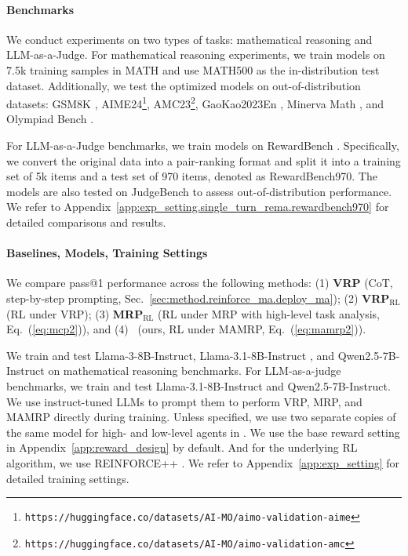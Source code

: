 \paragraph{Benchmarks} We conduct experiments on two types of tasks: mathematical reasoning and LLM-as-a-Judge. For mathematical reasoning experiments, we train models on 7.5k training samples in MATH \citep{hendrycks2021measuring} and use MATH500 \citep{lightman2023let} as the in-distribution test dataset. Additionally, we test the optimized models on out-of-distribution datasets: GSM8K \citep{cobbe2021training}, AIME24\footnote{\texttt{https://huggingface.co/datasets/AI-MO/aimo-validation-aime}}, AMC23\footnote{\texttt{https://huggingface.co/datasets/AI-MO/aimo-validation-amc}}, GaoKao2023En \citep{zhang2023evaluating}, Minerva Math \citep{lewkowycz2022solving}, and Olympiad Bench \citep{he2024olympiadbench}. 

For LLM-as-a-Judge benchmarks, we train models on RewardBench \citep{lambert2024rewardbench}. Specifically, we convert the original data into a pair-ranking format and split it into a training set of 5k items and a test set of 970 items, denoted as RewardBench970. The models are also tested on JudgeBench \citep{tan2024judgebench} to assess out-of-distribution performance. We refer to Appendix~\ref{app:exp_setting.single_turn_rema.rewardbench970} for detailed comparisons and results.

\paragraph{Baselines, Models, Training Settings} 
We compare pass@1 performance across the following methods:
(1) \textbf{VRP} (CoT, step-by-step prompting, Sec.~\ref{sec:method.reinforce_ma.deploy_ma}); 
(2) \textbf{VRP$_\text{RL}$} (RL under VRP);
(3) \textbf{MRP$_\text{RL}$} (RL under MRP with high-level task analysis, Eq.~(\ref{eq:mcp2})), and (4) \textbf{\method}~(ours, RL under MAMRP, Eq.~(\ref{eq:mamrp2})).

We train and test Llama-3-8B-Instruct, Llama-3.1-8B-Instruct \citep{dubey2024llama}, and Qwen2.5-7B-Instruct \citep{qwen2.5} on mathematical reasoning benchmarks.
For LLM-as-a-judge benchmarks, we train and test Llama-3.1-8B-Instruct and Qwen2.5-7B-Instruct. 
We use instruct-tuned LLMs to prompt them to perform VRP, MRP, and MAMRP directly during training.
Unless specified, we use two separate copies of the same model for high- and low-level agents in \method.
We use the base reward setting in Appendix~\ref{app:reward_design} by default. And for the underlying RL algorithm, we use REINFORCE++ \citep{hu2025reinforce++}. We refer to Appendix~\ref{app:exp_setting} for detailed training settings.

